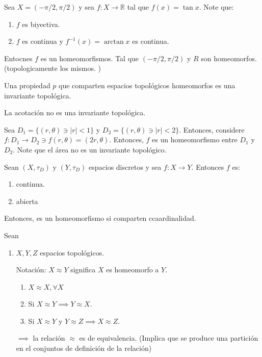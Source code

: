 \begin{ejemplo}
    Sea $X=(-\pi/2,\pi/2)$ y sea $f: X\to \mathbb{R}$ tal que $f(x)=\tan x$. Note que: 
    \begin{enumerate}
        \item $f$ es biyectiva. 
        \item $f$ es continua y $f^{-1}(x)=\arctan x$ es continua. 
    \end{enumerate}
    Entocnes $f$ es un homeomorfismos. Tal que $(-\pi/2,\pi/2)$ y $R$ son homeomorfos. (topologicamente los mismos. )
\end{ejemplo}

\begin{nota}
    Una propiedad $p$ que comparten espacios topológicos homeomorfos es una invariante topológica.  
\end{nota}

\begin{ejemplo}
    La acotación no es una invariante topológica. 
\end{ejemplo}

\begin{ejemplo}
    Sea $D_1=\{(r,\theta)\ni |r|<1\}$ y $D_2=\{(r,\theta)\ni |r|<2\}$. Entonces, considere $f:D_1\to D_2\ni f(r,\theta)= (2r,\theta)$. Entonces, $f$ es un homeomorfismo entre $D_1$ y $D_2$. Note que el área no es un invariante topológico. 
\end{ejemplo}

\begin{ejemplo}
    Sean $(X,\tau_D)$ y $(Y,\tau_D)$ espacios discretos y sea $f:X\to Y$.
    Entonces $f$ es: \begin{enumerate}
        \item continua.
        \item abierta
    \end{enumerate}
    Entonces, es un homeomorfismo si comparten ccaardinalidad. 
\end{ejemplo}

\begin{nota} Sean
    \begin{enumerate}
        \item $X,Y,Z$ espacios topológicos. 
        \begin{nota}
            Notación: $X\approx Y $ significa $X$ es homeomorfo a $Y$. 
        \end{nota} 
        \begin{enumerate}
            \item $X\approx X,\forall X$
            \item Si $X\approx Y\implies Y \approx X$. 
            \item Si $X\approx Y$ y $Y\approx Z\implies X\approx Z$. 
        \end{enumerate}
        $\implies$ la relación $\approx$ es de equivalencia. (Implica que se produce una partición en el conjuntos de definición de la relación)
    \end{enumerate}
\end{nota}

